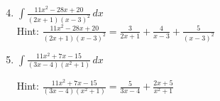 \documentclass[12pt]{article}
\newif\ifans
\begin{document}
\begin{enumerate}
\setcounter{enumi}{3}

\item $\int \frac{11x^2-28x+20}{(2x+1)(x-3)^2} \,dx$\\

Hint: $\frac{11x^2-28x+20}{(2x+1)(x-3)^2} = \frac{3}{2x+1}+\frac{4}{x-3}+\frac{5}{(x-3)^2}$

\ifans{\fbox{$\frac{3}{2}\ln{|2x+1|}+4\ln{|x-3|}-\frac{5}{2(x-3)}+C$}} \fi

\item $\int \frac{11x^2+7x-15}{(3x-4)(x^2+1)} \,dx$

Hint: $\frac{11x^2+7x-15}{(3x-4)(x^2+1)} = \frac{5}{3x-4}+\frac{2x+5}{x^2+1}$

\ifans{\fbox{$\frac{5}{3}\ln{|3x-4|}+\ln(x^2+1)+5\tan^{-1}{x}+C$}} \fi

\end{enumerate}

\newpage

\end{document}
